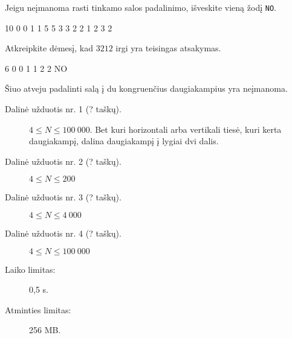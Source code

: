 \documentclass{boi2014-lt}
\newcommand{\constant}[1]{{\tt #1}}
\begin{document}
    Jeigu neįmanoma rasti tinkamo salos padalinimo, išveskite vieną žodį
    \constant{NO}.

    \Examples
	\example
	{
		10  0  0  1  1  5  5  3  3  2  2
	}
	{
		1 2 3 2
	}
	{
		Atkreipkite dėmesį, kad $3 2 1 2$ irgi yra teisingas atsakymas.
		
        \begin{center}
        \end{center}
	}

	\example
	{
		6  0  0  1  1  2  2
	}
	{
		NO
	}
	{
        Šiuo atveju padalinti salą į du kongruenčius daugiakampius yra neįmanoma.
        \begin{center}
        \end{center}
	}

    \Scoring

    \begin{description}
        \item[Dalinė užduotis nr. 1 (? taškų).] $4 \le N \le 100\ 000$.
            Bet kuri horizontali arba vertikali tiesė, kuri kerta daugiakampį,
            dalina daugiakampį į lygiai dvi dalis.
        \item[Dalinė užduotis nr. 2 (? taškų).] $4 \le N \le 200$
        \item[Dalinė užduotis nr. 3 (? taškų).] $4 \le N \le 4\ 000$
        \item[Dalinė užduotis nr. 4 (? taškų).] $4 \le N \le 100\ 000$
    \end{description}

    \Constraints

    \begin{description}
        \item[Laiko limitas:] 0,5 s.
        \item[Atminties limitas:] 256 MB.
    \end{description}
\end{document}
